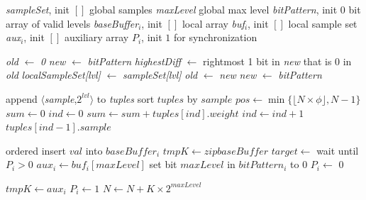 \begin{algorithm}[tb]
\small
\begin{algorithmic}[1]

\Vars
\State \emph{sampleSet}, init $[ ]$ \Comment global samples
\State \emph{maxLevel} \Comment global max level
\State \emph{bitPattern}, init 0 \Comment bit array of valid levels
\State 
\Statex
{}
	\State \emph{baseBuffer$_i$}, init $[ ]$ \Comment local array
	\State \emph{buf$_i$}, init $[ ]$ \Comment local sample set
	\State \emph{aux$_i$}, init $[ ]$ \Comment auxiliary array
	 $P_i$, init $1$ \Comment for synchronization
\EndFor
\EndFor

\Statex
{}
\State \emph{old} $\leftarrow$ \emph{0}
\State \emph{new} $\leftarrow$ \emph{bitPattern}
	\State \emph{highestDiff} $\leftarrow$ rightmost 1 bit in \emph{new} that is 0 in \emph{old}
			\State \emph{localSampleSet[lvl]} $\leftarrow$ \emph{sampleSet[lvl]}
		\EndIf
	\EndFor
	\State \emph{old} $\leftarrow$ \emph{new}
	\State \emph{new} $\leftarrow$ \emph{bitPattern}
\EndWhile

 \label{l:caught-snapshot}
		\State append $\langle$\emph{sample},\emph{$2^{lvl}$}$\rangle$ to \emph{tuples}
	\EndFor
\EndFor
\State sort $tuples$ by $sample$
\State $pos \leftarrow \min {\{\lfloor N \times \phi \rfloor, N-1\}}$
\State $sum \leftarrow 0$
\State $ind \leftarrow 0$
	\State $sum \leftarrow sum + tuples[ind].weight$
	\State $ind \leftarrow ind + 1$
\EndWhile
\State \Return $tuples[ind-1].sample$ 
\EndProcedure

\State ordered insert $val$ into $baseBuffer_i$
	\State $tmpK \leftarrow zip baseBuffer$
	\State $target \leftarrow$ 
		\State wait until $P_i>0$
		\State $aux_i \leftarrow buf_i[maxLevel]$
		\State set bit $maxLevel$ in $bitPattern_i$ to 0
		\State $P_i \leftarrow$ 0
	\EndIf
\EndIf
\EndProcedure

		\State $tmpK \leftarrow aux_i$
		\State $P_i \leftarrow 1$
		\State {}
		\State $N \leftarrow N + K \times 2^{maxLevel}$
\EndFor
\EndWhile
\EndProcedure


\end{algorithmic}
\end{algorithm}
